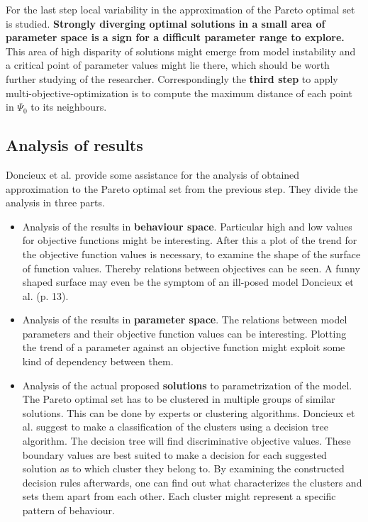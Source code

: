 \documentclass[12pt,twoside]{article}
\theoremstyle{plain}
\theoremstyle{definition}
\theoremstyle{remark}
\begin{document}
For the last step local variability in the approximation of the Pareto optimal set is studied. \textbf{Strongly diverging optimal solutions in a small area of parameter space is a sign for a difficult parameter range to explore.}
This area of high disparity of solutions might emerge from model instability and a critical point of parameter values might lie there, which should be worth further studying of the researcher.
Correspondingly the \textbf{third step} to apply multi-objective-optimization is to compute the maximum distance of each point in $\Psi_0$ to its neighbours.
\subsection{Analysis of results}
Doncieux et al. provide some assistance for the analysis of obtained approximation to the Pareto optimal set from the previous step. They divide the analysis in three parts.
\begin{itemize}
	\item Analysis of the results in \textbf{behaviour space}. Particular high and low values for objective functions might be interesting. After this a plot of the trend for the objective function values is necessary, to examine the shape of the surface of function values. Thereby relations between objectives can be seen. A funny shaped surface \glqq may even be the symptom of an ill-posed model\grqq{} Doncieux et al. \cite{doncieux2015multi} (p. 13).
	\item Analysis of the results in \textbf{parameter space}. The relations between model parameters and their objective function values can be interesting. Plotting the trend of a parameter against an objective function might exploit some kind of dependency between them.
	\item Analysis of the actual proposed \textbf{solutions} to parametrization of the model. The Pareto optimal set has to be clustered in multiple groups of similar solutions. This can be done by experts or clustering algorithms.
	Doncieux et al. suggest to make a classification of the clusters using a decision tree algorithm. The decision tree will find discriminative objective values. These boundary values are best suited to make a decision for each suggested solution as to which cluster they belong to.
	By examining the constructed decision rules afterwards, one can find out what characterizes the clusters and sets them apart from each other. Each cluster might represent a specific pattern of behaviour.
\end{itemize}
\end{document}
